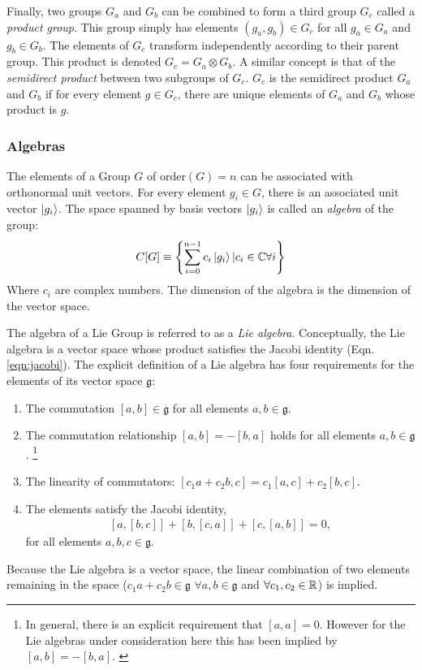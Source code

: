 Finally, two groups $G_a$ and $G_b$ can be combined to form a third group $G_c$ called a \emph{product group}.
This group simply has elements $(g_a,g_b)\in G_c$ for all $g_a\in G_a$ and $g_b\in G_b$.
The elements of $G_c$ transform independently according to their parent group.
This product is denoted $G_c=G_a\otimes G_b$.
A similar concept is that of the \emph{semidirect product} between two subgroups of $G_c$.
$G_c$ is the semidirect product $G_a$ and $G_b$ if for every element $g\in G_c$, there are unique elements of $G_a$ and $G_b$ whose product is $g$.

\subsubsection{Algebras}\label{sec:algebras}

The elements of a Group $G$ of $\text{order}(G)=n$ can be associated with orthonormal unit vectors. 
For every element $g_i\in G$, there is an associated unit vector $\ket{g_i}$.
The space spanned by basis vectors $\ket{g_i}$ is called an \emph{algebra} of the group:
\begin{equation}\begin{split}\label{eqn:algebra}
    C[G]\equiv\left\{\sum_{i=0}^{n-1}c_i\ket{g_i}\vert c_i\in \mathbb{C} \forall i\right\}
\end{split}\end{equation} 
Where $c_i$ are complex numbers. The dimension of the algebra is the dimension of the vector space.

The algebra of a Lie Group is referred to as a \emph{Lie algebra}.
Conceptually, the Lie algebra is a vector space whose product satisfies the Jacobi identity (Eqn. \ref{eqn:jacobi}).
The explicit definition of a Lie algebra has four requirements for the elements of its vector space $\mathfrak{g}$:
\begin{enumerate}
    \item The commutation $[a,b]\in\mathfrak{g}$ for all elements $a,b\in\mathfrak{g}$.
    \item The commutation relationship $[a,b]=-[b,a]$ holds for all elements $a,b\in\mathfrak{g}$. \footnote[1]{In general, there is an explicit requirement that $[a,a]=0$. However for the Lie algebras under consideration here this has been implied by $[a,b]=-[b,a]$. \cite{pfeifer}}
    \item The linearity of commutators: $[c_1a+c_2b,c]=c_1[a,c]+c_2[b,c]$.
    \item The elements satisfy the Jacobi identity,
    \begin{equation}\begin{split}\label{eqn:jacobi}
        [a,[b,c]]+[b,[c,a]]+[c,[a,b]]=0,
    \end{split}\end{equation} 
    for all elements $a,b,c\in\mathfrak{g}$.
\end{enumerate}
Because the Lie algebra is a vector space, the linear combination of two elements remaining in the space ($c_1a+c_2b\in\mathfrak{g}$ $\forall a,b\in\mathfrak{g}$ and  $\forall c_1,c_2\in\mathbb{R}$) is implied.


